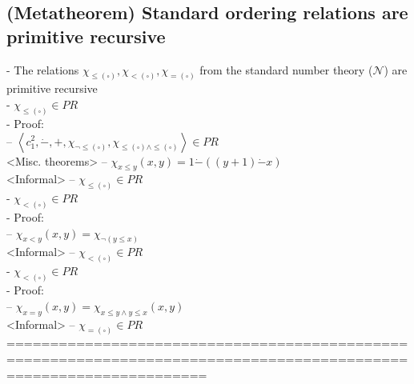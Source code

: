 \documentclass{book}
\newcommand{\placeholder}{\square}
\newcommand{\seq}[1]{\left\langle #1 \right\rangle}
\begin{document}
\subsection{(Metatheorem) Standard ordering relations are primitive recursive} %
	- The relations $\chi_{\leq(\placeholder)}, \chi_{<(\placeholder)}, \chi_{=(\placeholder)}$ from the standard number theory ($\mathcal{N}$) are primitive recursive \\
	- $\chi_{\leq(\placeholder)} \in PR$ \\
	- Proof: \\
		-- $\seq{c_1^2, \dot{-}, +, \chi_{\lnot \leq(\placeholder)}, \chi_{\leq(\placeholder) \land \leq(\placeholder)}} \in PR$ \\ <Misc. theorems>
		-- $\chi_{x \leq y}(x, y) = 1 \dot{-} ((y+1) \dot{-} x)$ \\ <Informal>
		-- $\chi_{\leq(\placeholder)} \in PR$ \\
	- $\chi_{<(\placeholder)} \in PR$ \\
	- Proof: \\
		-- $\chi_{x < y}(x, y) = \chi_{\lnot (y \leq x)}$ \\ <Informal>
		-- $\chi_{<(\placeholder)} \in PR$ \\
	- $\chi_{<(\placeholder)} \in PR$ \\
	- Proof: \\
		-- $\chi_{x = y}(x, y) = \chi_{x \leq y \land y \leq x}(x, y)$ \\ <Informal>
		-- $\chi_{=(\placeholder)} \in PR$ \\
	===================================================================================================================
\end{document}
